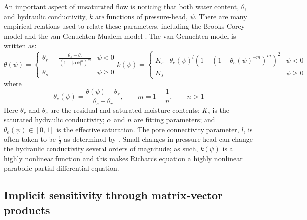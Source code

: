 \documentclass[11pt]{article}
\begin{document}
An important aspect of unsaturated flow is noticing that both water content, $\theta$, and hydraulic conductivity, $k$ are functions of pressure-head, $\psi$. There are many empirical relations used to relate these parameters, including the Brooks-Corey model \citep{Brooks1964} and the van Genuchten-Mualem model \citep{Mualem1976,VanGenuchten1980}. The van Genuchten model is written as:
\begin{subequations}
\label{eq:vanGenuchten}
\begin{equation}
\label{eq:theta_h}
    \theta(\psi) =
    \left\{\begin{aligned}
        \theta_r& + \frac{\theta_s- \theta_r}{(1+|\alpha \psi|^n)^m}  & \psi < 0 \\
        \theta_s& & \psi \ge 0
    \end{aligned}\right.
\end{equation}
\begin{equation}
\label{eq:K_h}
    k(\psi) =
    \left\{\begin{aligned}
        K_s & \theta_e(\psi)^l(1-(1- \theta_e(\psi)^{-m})^m)^2 & \psi < 0 \\
        K_s& & \psi \ge 0
    \end{aligned}\right.
\end{equation}
\end{subequations}
where
\begin{equation}
\label{eq:vanGenuchtenParams}
    \theta_e(\psi) = \frac{\theta(\psi) - \theta_r}{\theta_s - \theta_r},
    \qquad
    m=1- \frac{1}{n},
    \qquad
    n > 1
\end{equation}
Here $\theta_r$ and $\theta_s$ are the residual and saturated moisture contents; $K_s$ is the saturated hydraulic conductivity; $\alpha$ and $n$ are fitting parameters; and $\theta_e(\psi) \in [0,1]$ is the effective saturation. The pore connectivity parameter, $l$, is often taken to be $\frac{1}{2}$ as determined by \citep{Mualem1976}. Small changes in pressure head can change the hydraulic conductivity several orders of magnitude; as such, $k(\psi)$ is a highly nonlinear function and this makes Richards equation a highly nonlinear parabolic partial differential equation.

\subsection{Implicit sensitivity through matrix-vector products}
\end{document}
